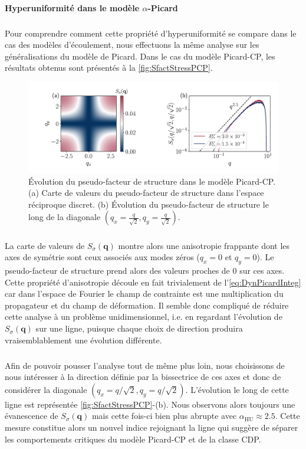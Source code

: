 \paragraph{Hyperuniformité dans le modèle $\alpha$-Picard}

\subparagraph{}Pour comprendre comment cette propriété d'hyperuniformité se compare dans le cas des modèles d'écoulement, nous effectuons la même analyse sur les généralisations du modèle de Picard. Dans le cas du modèle Picard-CP, les résultats obtenus sont présentés à la \autoref{fig:SfactStressPCP}.

\begin{figure}[h]
	\centering
	\includegraphics[width=\textwidth]{Chapitre4/Figures/Correlations/Sfact_SRP.pdf}
	\caption{Évolution du pseudo-facteur de structure dans le modèle Picard-CP. (a) Carte de valeurs du pseudo-facteur de structure dans l'espace réciproque discret. (b) Évolution du pseudo-facteur de structure le long de la diagonale $(q_x=\frac{q}{\sqrt{2}},q_y=\frac{q}{\sqrt{2}})$.}
	\label{fig:SfactStressPCP}
\end{figure}

\subparagraph{}La carte de valeurs de $S_\sigma(\mathbf{q})$ montre alors une anisotropie frappante dont les axes de symétrie sont ceux associés aux modes zéros ($q_x=0$ et $q_y=0$). Le pseudo-facteur de structure prend alors des valeurs proches de 0 sur ces axes. Cette propriété d'anisotropie découle en fait trivialement de l'\autoref{eq:DynPicardInteg} car dans l'espace de Fourier le champ de contrainte est une multiplication du propagateur et du champ de déformation. Il semble donc compliqué de réduire cette analyse à un problème unidimensionnel, i.e. en regardant l'évolution de $S_\sigma(\mathbf{q})$ sur une ligne, puisque chaque choix de direction produira vraisemblablement une évolution différente.

\subparagraph{}Afin de pouvoir pousser l'analyse tout de même plus loin, nous choisissons de nous intéresser à la direction définie par la bissectrice de ces axes et donc de considérer la diagonale $(q_x = q/\sqrt{2}, q_y = q/\sqrt{2})$. L'évolution le long de cette ligne est représentée \autoref{fig:SfactStressPCP}-(b). Nous observons alors toujours une évanescence de $S_\sigma(\mathbf{q})$ mais cette fois-ci bien plus abrupte avec $\alpha_\text{HU} \approx 2.5$. Cette mesure constitue alors un nouvel indice rejoignant la ligne qui suggère de séparer les comportements critiques du modèle Picard-CP et de la classe CDP.


